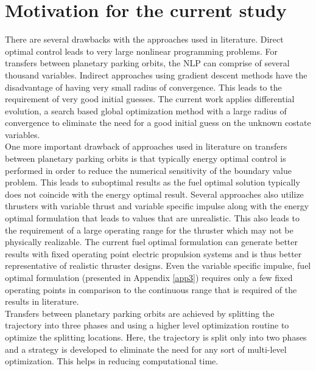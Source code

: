 \section{Motivation for the current study}
There are several drawbacks with the approaches used in literature. Direct optimal control leads to very large nonlinear programming problems. For transfers between planetary parking orbits, the NLP can comprise of several thousand variables. Indirect approaches using gradient descent methods have the disadvantage of having very small radius of convergence. This leads to the requirement of very good initial guesses. The current work applies differential evolution, a search based global optimization method with a large radius of convergence to eliminate the need for a good initial guess on the unknown costate variables.\\
One more important drawback of approaches used in literature on transfers between planetary parking orbits is that typically energy optimal control is performed in order to reduce the numerical sensitivity of the boundary value problem. This leads to suboptimal results as the fuel optimal solution typically does not coincide with the energy optimal result. Several approaches also utilize thrusters with variable thrust and variable specific impulse along with the energy optimal formulation that leads to values that are unrealistic. This also leads to the requirement of a large operating range for the thruster which may not be physically realizable. The current fuel optimal formulation can generate better results with fixed operating point electric propulsion systems and is thus better representative of realistic thruster designs. Even the variable specific impulse, fuel optimal formulation (presented in Appendix \ref{app3}) requires only a few fixed operating points in comparison to the continuous range that is required of the results in literature.\\
Transfers between planetary parking orbits are achieved by splitting the trajectory into three phases and using a higher level optimization routine to optimize the splitting locations. Here, the trajectory is split only into two phases and a strategy is developed to eliminate the need for any sort of multi-level optimization. This helps in reducing computational time.



